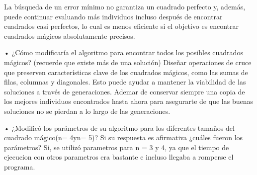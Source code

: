 \documentclass{report}
\begin{document}
    La búsqueda de un error mínimo no garantiza un cuadrado perfecto y, además, puede continuar evaluando más individuos incluso después de encontrar cuadrados casi perfectos, lo cual es menos eficiente si el objetivo es encontrar cuadrados mágicos absolutamente precisos.

    •  ¿Cómo modificaría el algoritmo para encontrar todos los posibles cuadrados mágicos? (recuerde que existe más de una solución)
    Diseñar operaciones de cruce que preserven características clave de los cuadrados mágicos, como las sumas de filas, columnas y diagonales. Esto puede ayudar a mantener la viabilidad de las soluciones a través de generaciones.
    Ademar de conservar siempre una copia de los mejores individuos encontrados hasta ahora para asegurarte de que las buenas soluciones no se pierdan a lo largo de las generaciones.

    •  ¿Modificó  los  parámetros  de  su  algoritmo  para  los  diferentes  tamaños  del  cuadrado  mágico(n= 4yn= 5)? Si su respuesta es afirmativa ¿cuáles fueron los parámetros?
    Si, se utilizó parametros para n = 3 y 4, ya que el tiempo de ejecucion con otros parametros era bastante e incluso llegaba a romperse el programa.
\end{document}
